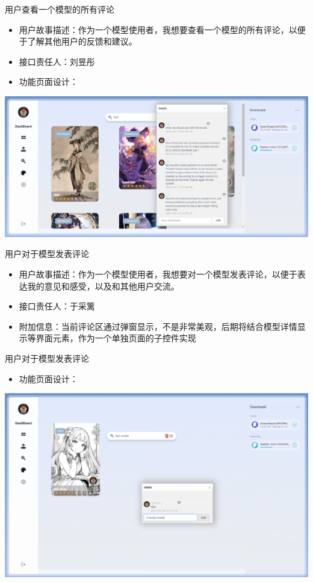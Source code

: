 \begin{frame}{用户查看一个模型的所有评论}
    \begin{itemize}
        \item 用户故事描述：作为一个模型使用者，我想要查看一个模型的所有评论，以便于了解其他用户的反馈和建议。
        \item 接口责任人：刘昱彤
        \item 功能页面设计： 
    \end{itemize}
\end{frame}

\begin{frame}
    \includegraphics[width=1\textwidth]{contents/figure/comment_search.png}
\end{frame}

\begin{frame}{用户对于模型发表评论}
    \begin{itemize}
        \item 用户故事描述：作为一个模型使用者，我想要对一个模型发表评论，以便于表达我的意见和感受，以及和其他用户交流。
        \item 接口责任人：于采篱
        \item 附加信息：当前评论区通过弹窗显示，不是非常美观，后期将结合模型详情显示等界面元素，作为一个单独页面的子控件实现
    \end{itemize}
\end{frame}

\begin{frame}{用户对于模型发表评论}
    \begin{itemize}
        \item 功能页面设计：
    \end{itemize}
    \includegraphics[width=1\textwidth]{contents/figure/user_stories_demo_add_comment.png}
\end{frame}


